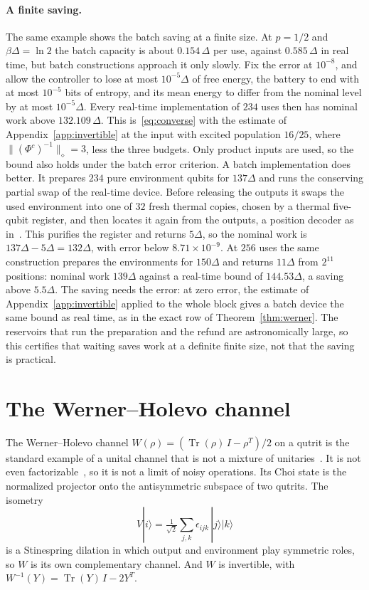 \documentclass[11pt]{article}
\theoremstyle{definition}
\theoremstyle{remark}
\newcommand{\Tr}{\operatorname{Tr}}
\begin{document}
\paragraph{A finite saving.} The same example shows the batch saving at a finite size. At $p=1/2$ and $\beta\Delta=\ln2$ the batch capacity is about $0.154\,\Delta$ per use, against $0.585\,\Delta$ in real time, but batch constructions approach it only slowly. Fix the error at $10^{-8}$, and allow the controller to lose at most $10^{-5}\Delta$ of free energy, the battery to end with at most $10^{-5}$ bits of entropy, and its mean energy to differ from the nominal level by at most $10^{-5}\Delta$. Every real-time implementation of $234$ uses then has nominal work above $132.109\,\Delta$. This is~\eqref{eq:converse} with the estimate of Appendix~\ref{app:invertible} at the input with excited population $16/25$, where $\|(\Phi^c)^{-1}\|_\diamond=3$, less the three budgets. Only product inputs are used, so the bound also holds under the batch error criterion. A batch implementation does better. It prepares $234$ pure environment qubits for $137\Delta$ and runs the conserving partial swap of the real-time device. Before releasing the outputs it swaps the used environment into one of $32$ fresh thermal copies, chosen by a thermal five-qubit register, and then locates it again from the outputs, a position decoder as in~\cite[Sec.~7]{FBB21}. This purifies the register and returns $5\Delta$, so the nominal work is $137\Delta-5\Delta=132\Delta$, with error below $8.71\times10^{-9}$. At $256$ uses the same construction prepares the environments for $150\Delta$ and returns $11\Delta$ from $2^{11}$ positions: nominal work $139\Delta$ against a real-time bound of $144.53\Delta$, a saving above $5.5\Delta$. The saving needs the error: at zero error, the estimate of Appendix~\ref{app:invertible} applied to the whole block gives a batch device the same bound as real time, as in the exact row of Theorem~\ref{thm:werner}. The reservoirs that run the preparation and the refund are astronomically large, so this certifies that waiting saves work at a definite finite size, not that the saving is practical.

\section{The Werner--Holevo channel}\label{sec:werner}

The Werner--Holevo channel $W(\rho)=(\Tr(\rho)\,I-\rho^T)/2$ on a qutrit is the standard example of a unital channel that is not a mixture of unitaries~\cite{LandauStreater93}. It is not even factorizable~\cite[Ex.~3.1]{HaagerupMusat11}, so it is not a limit of noisy operations. Its Choi state is the normalized projector onto the antisymmetric subspace of two qutrits. The isometry
\[
V|i\rangle=\tfrac{1}{\sqrt2}\sum_{j,k}\epsilon_{ijk}\,|j\rangle|k\rangle
\]
is a Stinespring dilation in which output and environment play symmetric roles, so $W$ is its own complementary channel. And $W$ is invertible, with $W^{-1}(Y)=\Tr(Y)\,I-2Y^T$.
\end{document}
